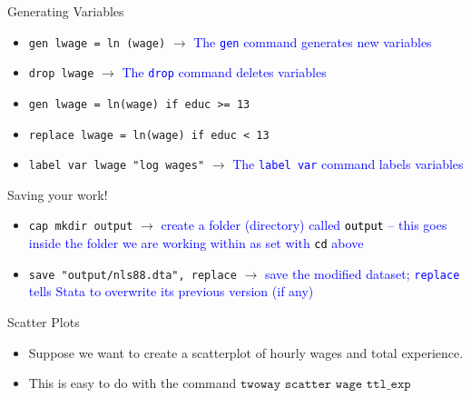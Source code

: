 \documentclass[11pt,notes=hide,aspectratio=169,mathserif]{beamer}
\begin{document}
\begin{frame}{Generating Variables}
\begin{itemize}
     \item \texttt{gen lwage = ln (wage)}  $\rightarrow$ \textcolor{blue}{The \texttt{gen} command generates new variables} 
     \item \texttt{drop lwage}  $\rightarrow$ \textcolor{blue}{The \texttt{drop} command deletes variables} 
     \item \texttt{gen lwage = ln(wage) if educ >= 13}  
     \item \texttt{replace lwage = ln(wage) if educ < 13} 
     \item \texttt{label var lwage "log wages"}  $\rightarrow$ \textcolor{blue}{The \texttt{label var} command labels variables} 
\end{itemize}
\end{frame}

\begin{frame}{Saving your work!}
    \begin{itemize}
        \item \texttt{cap mkdir output}	$\rightarrow$ \textcolor{blue}{create a folder (directory) called \textcolor{black}{\texttt{output}} -- this goes inside the folder we are working within as set with \textcolor{black}{\texttt{cd}} above }\smallskip
        \item \texttt{save "output/nls88.dta", replace} $\rightarrow$ \textcolor{blue}{save the modified dataset; \texttt{replace} tells Stata to overwrite its previous version (if any)}\smallskip
    \end{itemize}
\end{frame}

\begin{frame}{Scatter Plots}
    \begin{itemize}
        \item Suppose we want to create a scatterplot of hourly wages and total experience. 
        \item This is easy to do with the command 
            $\texttt{twoway scatter wage ttl\_exp}$
    \end{itemize}
\end{frame}
\end{document}
